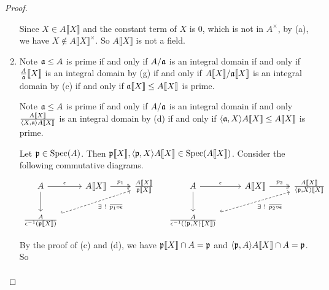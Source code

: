 \begin{proof}
\begin{enumerate}
            Since $X \in A\llbracket X \rrbracket$ and the constant term of $X$ is 0, which is not in $A^\times$, by (a), we have $X \not \in A\llbracket X \rrbracket^\times$. So $A\llbracket X \rrbracket$ is not a field.
        \item 
            Note $\mathfrak{a} \leq A$ is prime if and only if $A/\mathfrak{a}$ is an integral domain if and only if $\frac{A}{\mathfrak{a}}\llbracket X \rrbracket$ is an integral domain by (g) if and only if $A\llbracket X \rrbracket/\mathfrak{a} \llbracket X \rrbracket$ is an integral domain by (c) if and only if $\mathfrak{a}\llbracket X \rrbracket \leq A \llbracket X \rrbracket$ is prime. \par 
            Note $\mathfrak{a} \leq A$ is prime if and only if $A/\mathfrak{a}$ is an integral domain if and only $\frac{A\llbracket X \rrbracket}{\langle X,\mathfrak{a} \rangle A\llbracket X \rrbracket}$ is an integral domain by (d) if and only if $\langle \mathfrak{a},X \rangle A\llbracket X \rrbracket \leq A\llbracket X \rrbracket$ is prime. \par
            Let $\mathfrak{p} \in \operatorname{Spec}(A)$. Then $\mathfrak{p}\llbracket X \rrbracket, \langle \mathfrak{p},X \rangle A\llbracket X \rrbracket \in \operatorname{Spec}(A\llbracket X \rrbracket)$. Consider the following commutative diagrams.
            \[
                \begin{tikzcd}
                    A \arrow[r,"\epsilon"] \arrow[d] & A \llbracket X \rrbracket \arrow[r,two heads, "p_1"] & \frac{A \llbracket X \rrbracket}{\ffp\llbracket X \rrbracket} \\
                    \frac{A}{\epsilon^{-1}(\ffp \llbracket X \rrbracket)} \arrow[rru,dashed,hook,"\ex !\ \overbar {p_1 \circ \epsilon}"']
                \end{tikzcd}
                \quad
                \begin{tikzcd}
                    A \arrow[r,"\epsilon"] \arrow[d] & A \llbracket X \rrbracket \arrow[r,two heads, "p_2"] & \frac{A \llbracket X \rrbracket}{\langle \ffp,X \rangle\llbracket X \rrbracket} \\
                    \frac{A}{\epsilon^{-1}(\langle \ffp,X \rangle \llbracket X \rrbracket)} \arrow[rru,dashed,hook,"\ex !\ \overbar {p_2 \circ \epsilon}"']
                \end{tikzcd}
            \]
            \par By the proof of (c) and (d), we have $\mathfrak{p} \llbracket X \rrbracket \cap A = \mathfrak{p}$ and $\langle \mathfrak{p},A \rangle A\llbracket X \rrbracket \cap A = \mathfrak{p}$. So
            \begin{align*}

\end{align*}
\end{enumerate}
\end{proof}
